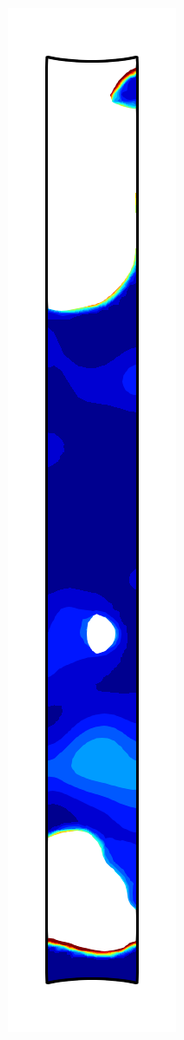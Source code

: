 \begin{figure}[!htb]
\begin{subfigure}{0.08\textwidth}
  \end{subfigure}
  \begin{subfigure}{0.08\textwidth}
    \centering
    \includegraphics[width=\textwidth]{Chapter5/figures/spallation/psii_2}

\end{subfigure}
\end{figure}
